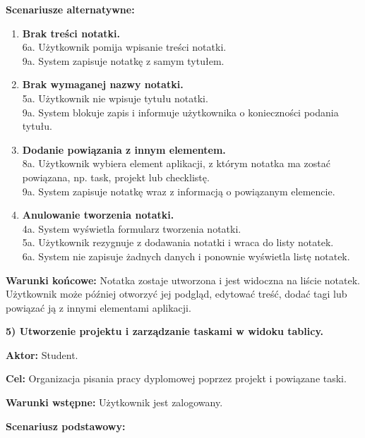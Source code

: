 \documentclass[12pt,a4paper,twoside]{report}
\begin{document}
\noindent \textbf{Scenariusze alternatywne:}

\begin{enumerate}
\def\labelenumi{\arabic{enumi}.}
\item
  \textbf{Brak treści notatki.}\\
  6a. Użytkownik pomija wpisanie treści notatki.\\
  9a. System zapisuje notatkę z samym tytułem.
\item
  \textbf{Brak wymaganej nazwy notatki.}\\
  5a. Użytkownik nie wpisuje tytułu notatki.\\
  9a. System blokuje zapis i informuje użytkownika o konieczności podania tytułu.
\item
  \textbf{Dodanie powiązania z innym elementem.}\\
  8a. Użytkownik wybiera element aplikacji, z którym notatka ma zostać powiązana, np. task, projekt lub checklistę.\\
  9a. System zapisuje notatkę wraz z informacją o powiązanym elemencie.
\item
  \textbf{Anulowanie tworzenia notatki.}\\
  4a. System wyświetla formularz tworzenia notatki.\\
  5a. Użytkownik rezygnuje z dodawania notatki i wraca do listy notatek.\\
  6a. System nie zapisuje żadnych danych i ponownie wyświetla listę notatek.
\end{enumerate}

\noindent \textbf{Warunki końcowe:} Notatka zostaje utworzona i jest widoczna na liście notatek. Użytkownik może później otworzyć jej podgląd, edytować treść, dodać tagi lub powiązać ją z innymi elementami aplikacji.

\vspace{\baselineskip}

\noindent \textbf{5) Utworzenie projektu i zarządzanie taskami w widoku tablicy.}

\noindent \textbf{Aktor:} Student.

\noindent \textbf{Cel:} Organizacja pisania pracy dyplomowej poprzez projekt i powiązane taski.

\noindent \textbf{Warunki wstępne:} Użytkownik jest zalogowany.

\noindent \textbf{Scenariusz podstawowy:}
\end{document}
